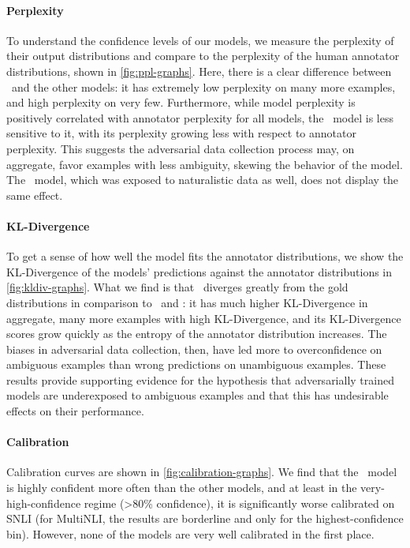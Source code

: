 \documentclass[10pt,a4paper]{article}
\begin{document}
\paragraph{Perplexity}
To understand the confidence levels of our models, we measure the perplexity of their output distributions and compare to the perplexity of the human annotator distributions, shown in \autoref{fig:ppl-graphs}.
Here, there is a clear difference between \adversarial\ and the other models: it has extremely low perplexity on many more examples, and high perplexity on very few.
Furthermore, while model perplexity is positively correlated with annotator perplexity for all models, the \adversarial\ model is less sensitive to it, with its perplexity growing less with respect to annotator perplexity.
This suggests the adversarial data collection process may, on aggregate, favor examples with less ambiguity, skewing the behavior of the model.
The \all\ model, which was exposed to naturalistic data as well, does not display the same effect.

\paragraph{KL-Divergence}
To get a sense of how well the model fits the annotator distributions, we show the KL-Divergence of the models' predictions against the annotator distributions in \autoref{fig:kldiv-graphs}.
What we find is that \adversarial\ diverges greatly from the gold distributions in comparison to \classical\ and \all: it has much higher KL-Divergence in aggregate, many more examples with high KL-Divergence, and its KL-Divergence scores grow quickly as the entropy of the annotator distribution increases.
The biases in adversarial data collection, then, have led more to overconfidence on ambiguous examples than wrong predictions on unambiguous examples.
These results provide supporting evidence for the hypothesis that adversarially trained models are underexposed to ambiguous examples and that this has undesirable effects on their performance.

\paragraph{Calibration}
Calibration curves are shown in \autoref{fig:calibration-graphs}. We find that the \adversarial\ model is highly confident more often than the other models, and at least in the very-high-confidence regime (>80\% confidence), it is significantly worse calibrated on SNLI (for MultiNLI, the results are borderline and only for the highest-confidence bin). However, none of the models are very well calibrated in the first place.
\end{document}
